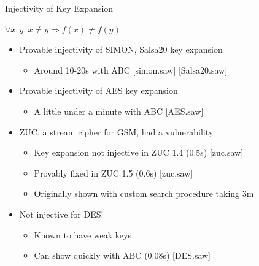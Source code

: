 \documentclass[ignorenonframetext,]{beamer}
\providecommand{\tightlist}{%
  \setlength{\itemsep}{0pt}\setlength{\parskip}{0pt}}
\newcommand{\infile}[1]{{\tiny \alert{[#1]}}}
\begin{document}
\begin{frame}{Injectivity of Key Expansion}

\begin{center}
$\forall x, y.~x \neq y \Rightarrow f(x) \neq f(y)$
\end{center}

\begin{itemize}
\tightlist
\item
  Provable injectivity of SIMON, Salsa20 key expansion

  \begin{itemize}
  \tightlist
  \item
    Around 10-20s with ABC \infile{simon.saw} \infile{Salsa20.saw}
  \end{itemize}
\item
  Provable injectivity of AES key expansion

  \begin{itemize}
  \tightlist
  \item
    A little under a minute with ABC \infile{AES.saw}
  \end{itemize}
\item
  ZUC, a stream cipher for GSM, had a vulnerability

  \begin{itemize}
  \tightlist
  \item
    Key expansion not injective in ZUC 1.4 (0.5s) \infile{zuc.saw}
  \item
    Provably fixed in ZUC 1.5 (0.6s) \infile{zuc.saw}
  \item
    Originally shown with custom search procedure taking 3m
  \end{itemize}
\item
  \alert{Not injective} for DES!

  \begin{itemize}
  \tightlist
  \item
    Known to have weak keys
  \item
    Can show quickly with ABC (0.08s) \infile{DES.saw}
  \end{itemize}
\end{itemize}

\end{frame}
\end{document}
